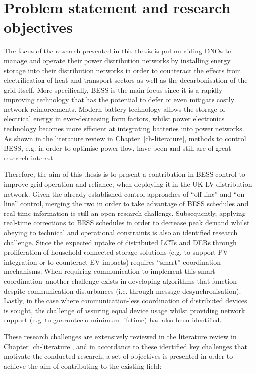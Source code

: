 \section{Problem statement and research objectives}
\label{ch-introduction:sec:problem-statement}

The focus of the research presented in this thesis is put on aiding DNOs to manage and operate their power distribution networks by installing energy storage into their distribution networks in order to counteract the effects from electrification of heat and transport sectors as well as the decarbonisation of the grid itself.
More specifically, BESS is the main focus since it is a rapidly improving technology that has the potential to defer or even mitigate costly network reinforcements.
Modern battery technology allows the storage of electrical energy in ever-decreasing form factors, whilst power electronics technology becomes more efficient at integrating batteries into power networks.
As shown in the literature review in Chapter~\ref{ch-literature}, methods to control BESS, e.g. in order to optimise power flow, have been and still are of great research interest.

Therefore, the aim of this thesis is to present a contribution in BESS control to improve grid operation and reliance, when deploying it in the UK LV distribution network.
Given the already established control approaches of ``off-line'' and ``on-line'' control, merging the two in order to take advantage of BESS schedules and real-time information is still an open research challenge.
Subsequently, applying real-time corrections to BESS schedules in order to decrease peak demand whilst obeying to technical and operational constraints is also an identified research challenge.
Since the expected uptake of distributed LCTs and DERs through proliferation of household-connected storage solutions (e.g. to support PV integration or to counteract EV impacts) requires ``smart'' coordination mechanisms.
When requiring communication to implement this smart coordination, another challenge exists in developing algorithms that function despite communication disturbances (i.e. through message desynchronisation).
Lastly, in the case where communication-less coordination of distributed devices is sought, the challenge of assuring equal device usage whilst providing network support (e.g. to guarantee a minimum lifetime) has also been identified.

These research challenges are extensively reviewed in the literature review in Chapter \ref{ch-literature}, and in accordance to these identified key challenges that motivate the conducted research, a set of objectives is presented in order to achieve the aim of contributing to the existing field:

